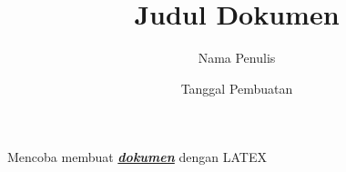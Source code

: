 \documentclass [a4paper,12pt] {article}
\begin{document}
\title{Judul Dokumen}
\author{Nama Penulis}
\date{Tanggal Pembuatan}


Mencoba membuat \underline{\textit{\textbf{dokumen}}} dengan LATEX
\end{document}
